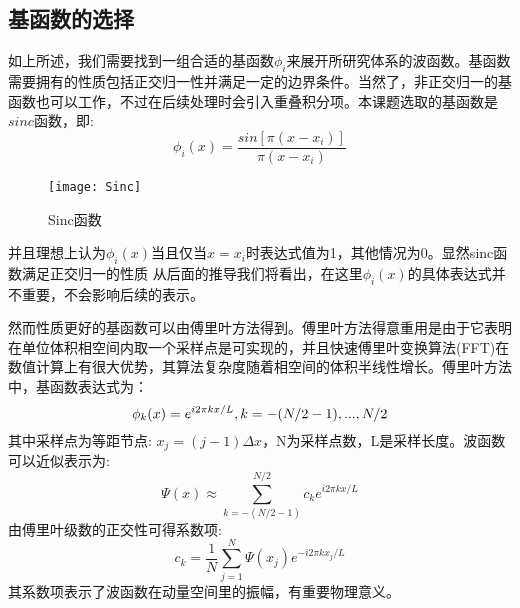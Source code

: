 \subsection{基函数的选择}\label{sec:basis}
如上所述，我们需要找到一组合适的基函数$\phi_i$来展开所研究体系的波函数。基函数需要拥有的性质包括正交归一性并满足一定的边界条件。当然了，非正交归一的基函数也可以工作，不过在后续处理时会引入重叠积分项。本课题选取的基函数是$sinc$函数，即:
\begin{equation}
  \phi_i(x) = \frac{sin[\pi(x-x_i)]}{\pi (x-x_i)}
\end{equation}
\begin{figure}[hbt]
  \center
  \vspace{-1mm}
  \texttt{[image: Sinc]}
  \caption{Sinc函数}
  \label{fig:Sinc}
\end{figure}
并且理想上认为$\phi_i(x)$当且仅当$x=x_i$时表达式值为1，其他情况为0。显然sinc函数满足正交归一的性质
从后面的推导我们将看出，在这里$\phi_i(x)$的具体表达式并不重要，不会影响后续的表示。

然而性质更好的基函数可以由傅里叶方法得到。傅里叶方法得意重用是由于它表明在单位体积相空间内取一个采样点是可实现的，并且快速傅里叶变换算法(FFT)在数值计算上有很大优势，其算法复杂度随着相空间的体积半线性增长。傅里叶方法中，基函数表达式为：
\begin{equation}
  \small{\phi_k(x) = e^{i 2 \pi k x / L}, k = -(N/2-1),...,N/2}
\end{equation}
其中采样点为等距节点: $x_j = (j-1) \Delta x$，N为采样点数，L是采样长度。波函数可以近似表示为:
\begin{equation}
  \Psi(x) \approx \sum_{k=-(N/2-1)}^{N/2} c_k e^{i 2 \pi k x / L}
\end{equation}
由傅里叶级数的正交性可得系数项:
\begin{equation}
  c_k = \frac{1}{N} \sum_{j=1}^{N} \Psi(x_j) e^{-i 2\pi k x_j /L}
\end{equation}
其系数项表示了波函数在动量空间里的振幅，有重要物理意义。

